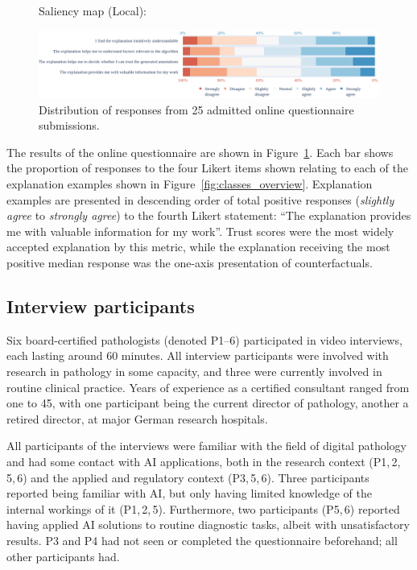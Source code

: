 \documentclass[final,5p,times,twocolumn,hyphens]{elsarticle}
\begin{document}
\begin{figure}
\begin{minipage}[c]{0.9\textwidth}
    Saliency map (Local):
    
    \includegraphics[width=\linewidth]{6_SaliencyMapLocal.png}
    \caption{Distribution of responses from 25 admitted online questionnaire submissions.}
\label{fig:results}
\end{minipage}
\end{figure}

The results of the online questionnaire are shown in Figure~\ref{fig:results}. Each bar shows the proportion of responses to the four Likert items shown relating to each of the explanation examples shown in Figure~\ref{fig:classes_overview}. Explanation examples are presented in descending order of total positive responses (\textit{slightly agree} to \textit{strongly agree}) to the fourth Likert statement: ``The explanation provides me with valuable information for my work''. Trust scores were the most widely accepted explanation by this metric, while the explanation receiving the most positive median response was the one-axis presentation of counterfactuals.

\subsection{Interview participants}

Six board-certified pathologists (denoted P1--6) participated in video interviews, each lasting around 60 minutes. All interview participants were involved with research in pathology in some capacity, and three were currently involved in routine clinical practice. Years of experience as a certified consultant ranged from one to 45, with one participant being the current director of pathology, another a retired director, at major German research hospitals.

All participants of the interviews were familiar with the field of digital pathology and had some contact with AI applications, both in the research context (P1,\,2,\,5,\,6) and the applied and regulatory context (P3,\,5,\,6). Three participants reported being familiar with AI, but only having limited knowledge of the internal workings of it (P1,\,2,\,5). Furthermore, two participants (P5,\,6) reported having applied AI solutions to routine diagnostic tasks, albeit with unsatisfactory results. P3 and P4 had not seen or completed the questionnaire beforehand; all other participants had.
\end{document}
